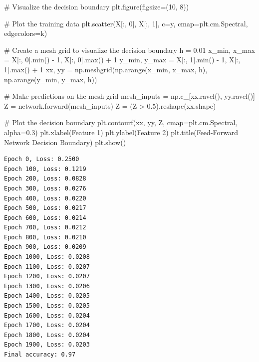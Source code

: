 \documentclass[
  letterpaper,
  DIV=11,
  numbers=noendperiod]{scrreprt}
\newenvironment{Shaded}{\begin{snugshade}}{\end{snugshade}}
\newcommand{\BuiltInTok}[1]{\textcolor[rgb]{0.00,0.23,0.31}{#1}}
\newcommand{\CommentTok}[1]{\textcolor[rgb]{0.37,0.37,0.37}{#1}}
\newcommand{\DecValTok}[1]{\textcolor[rgb]{0.68,0.00,0.00}{#1}}
\newcommand{\FloatTok}[1]{\textcolor[rgb]{0.68,0.00,0.00}{#1}}
\newcommand{\NormalTok}[1]{\textcolor[rgb]{0.00,0.23,0.31}{#1}}
\newcommand{\OperatorTok}[1]{\textcolor[rgb]{0.37,0.37,0.37}{#1}}
\newcommand{\StringTok}[1]{\textcolor[rgb]{0.13,0.47,0.30}{#1}}
\begin{document}
\begin{Shaded}
\begin{Highlighting}[]
\CommentTok{\# Visualize the decision boundary}
\NormalTok{plt.figure(figsize}\OperatorTok{=}\NormalTok{(}\DecValTok{10}\NormalTok{, }\DecValTok{8}\NormalTok{))}

\CommentTok{\# Plot the training data}
\NormalTok{plt.scatter(X[:, }\DecValTok{0}\NormalTok{], X[:, }\DecValTok{1}\NormalTok{], c}\OperatorTok{=}\NormalTok{y, cmap}\OperatorTok{=}\NormalTok{plt.cm.Spectral, edgecolors}\OperatorTok{=}\StringTok{\textquotesingle{}k\textquotesingle{}}\NormalTok{)}

\CommentTok{\# Create a mesh grid to visualize the decision boundary}
\NormalTok{h }\OperatorTok{=} \FloatTok{0.01}
\NormalTok{x\_min, x\_max }\OperatorTok{=}\NormalTok{ X[:, }\DecValTok{0}\NormalTok{].}\BuiltInTok{min}\NormalTok{() }\OperatorTok{{-}} \DecValTok{1}\NormalTok{, X[:, }\DecValTok{0}\NormalTok{].}\BuiltInTok{max}\NormalTok{() }\OperatorTok{+} \DecValTok{1}
\NormalTok{y\_min, y\_max }\OperatorTok{=}\NormalTok{ X[:, }\DecValTok{1}\NormalTok{].}\BuiltInTok{min}\NormalTok{() }\OperatorTok{{-}} \DecValTok{1}\NormalTok{, X[:, }\DecValTok{1}\NormalTok{].}\BuiltInTok{max}\NormalTok{() }\OperatorTok{+} \DecValTok{1}
\NormalTok{xx, yy }\OperatorTok{=}\NormalTok{ np.meshgrid(np.arange(x\_min, x\_max, h),}
\NormalTok{                     np.arange(y\_min, y\_max, h))}

\CommentTok{\# Make predictions on the mesh grid}
\NormalTok{mesh\_inputs }\OperatorTok{=}\NormalTok{ np.c\_[xx.ravel(), yy.ravel()]}
\NormalTok{Z }\OperatorTok{=}\NormalTok{ network.forward(mesh\_inputs)}
\NormalTok{Z }\OperatorTok{=}\NormalTok{ (Z }\OperatorTok{\textgreater{}} \FloatTok{0.5}\NormalTok{).reshape(xx.shape)}

\CommentTok{\# Plot the decision boundary}
\NormalTok{plt.contourf(xx, yy, Z, cmap}\OperatorTok{=}\NormalTok{plt.cm.Spectral, alpha}\OperatorTok{=}\FloatTok{0.3}\NormalTok{)}
\NormalTok{plt.xlabel(}\StringTok{\textquotesingle{}Feature 1\textquotesingle{}}\NormalTok{)}
\NormalTok{plt.ylabel(}\StringTok{\textquotesingle{}Feature 2\textquotesingle{}}\NormalTok{)}
\NormalTok{plt.title(}\StringTok{\textquotesingle{}Feed{-}Forward Network Decision Boundary\textquotesingle{}}\NormalTok{)}
\NormalTok{plt.show()}
\end{Highlighting}
\end{Shaded}

\begin{verbatim}
Epoch 0, Loss: 0.2500
Epoch 100, Loss: 0.1219
Epoch 200, Loss: 0.0828
Epoch 300, Loss: 0.0276
Epoch 400, Loss: 0.0220
Epoch 500, Loss: 0.0217
Epoch 600, Loss: 0.0214
Epoch 700, Loss: 0.0212
Epoch 800, Loss: 0.0210
Epoch 900, Loss: 0.0209
Epoch 1000, Loss: 0.0208
Epoch 1100, Loss: 0.0207
Epoch 1200, Loss: 0.0207
Epoch 1300, Loss: 0.0206
Epoch 1400, Loss: 0.0205
Epoch 1500, Loss: 0.0205
Epoch 1600, Loss: 0.0204
Epoch 1700, Loss: 0.0204
Epoch 1800, Loss: 0.0204
Epoch 1900, Loss: 0.0203
Final accuracy: 0.97
\end{verbatim}
\end{document}
